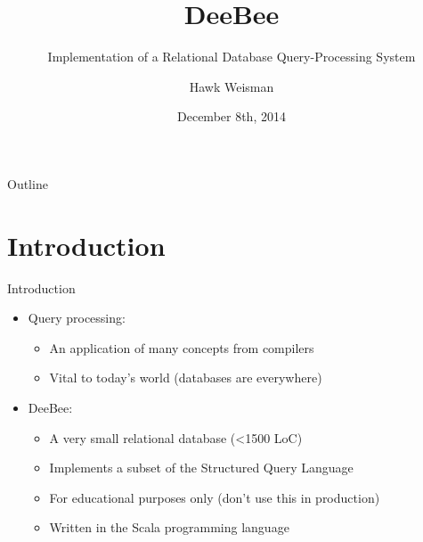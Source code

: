 \documentclass{beamer}
\title{DeeBee}
\subtitle{Implementation of a Relational Database Query-Processing System}
\author{Hawk Weisman}
\institute[Allegheny College] %
{Department of Computer Science\\Allegheny College
}
\date{December 8th, 2014}
\begin{document}
\begin{frame}
  \titlepage
\end{frame}

\begin{frame}{Outline}
  \tableofcontents
\end{frame}




\section{Introduction}
\begin{frame}{Introduction}
\begin{itemize}
  \item Query processing:  \pause
  \begin{itemize}
    \item An application of many concepts from compilers \pause
    \item Vital to today's world (databases are everywhere)  \pause
  \end{itemize}
  \item DeeBee: \pause
  \begin{itemize}
    \item A very small relational database (\textless 1500 LoC) \pause
    \item Implements a subset of the Structured Query Language  \pause
    \item For educational purposes only (don't use this in production)  \pause
    \item Written in the Scala programming language 
  \end{itemize}
  \end{itemize}
\end{frame}
\end{document}
